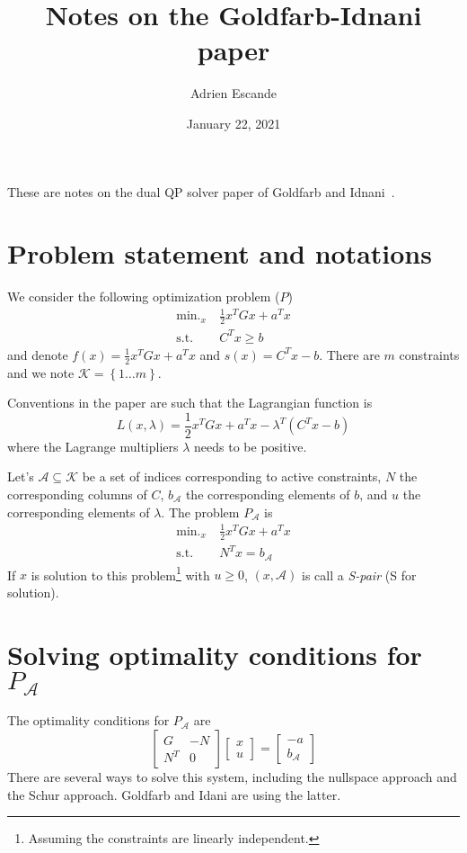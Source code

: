 \documentclass[11pt,a4paper]{article}
\newcommand{\BIN}{\begin{bmatrix}}
\newcommand{\BOUT}{\end{bmatrix}}
\DeclareMathOperator*{\minimize}{\min.}
\newcommand{\st}{\mbox{s.t.}}
\newcommand{\half}{\frac{1}{2}}
\newcommand{\act}{\mathcal{A}}
\begin{document}
\date{January 22, 2021}
\author{Adrien Escande}

\title{Notes on the Goldfarb-Idnani paper}
\maketitle

These are notes on the dual QP solver paper of Goldfarb and Idnani~\cite{Goldfarb:mp:1983}.

\section{Problem statement and notations}
We consider the following optimization problem ($P$)
\begin{align}
	\minimize_x &\ \half x^T G x + a^T x \\
	\st &\ C^T x \geq b
\end{align}
and denote $f(x) = \half x^T G x + a^T x$ and $s(x) = C^T x - b$.
There are $m$ constraints and we note $\mathcal{K} = \left\{1 \ldots m\right\}$.

Conventions in the paper are such that the Lagrangian function is
\begin{equation}
	L(x,\lambda) = \half x^T G x + a^T x - \lambda^T(C^T x - b)
\end{equation}
where the Lagrange multipliers $\lambda$ needs to be positive.

Let's $\mathcal{A} \subseteq \mathcal{K}$ be a set of indices corresponding to active constraints, $N$ the corresponding columns of $C$, $b_\mathcal{A}$ the corresponding elements of $b$, and $u$ the corresponding elements of $\lambda$. The problem $P_\mathcal{A}$ is
\begin{align}
	\minimize_x &\ \half x^T G x + a^T x \\
	\st &\ N^T x = b_\mathcal{A}
\end{align}
If $x$ is solution to this problem\footnote{Assuming the constraints are linearly independent.} with $u\geq 0$, $(x,\act)$ is call a \emph{S-pair} (S for solution).

\section{Solving optimality conditions for $P_\act$}
The optimality conditions for $P_\act$ are
\begin{equation}
	\BIN G & -N \\ N^T & 0 \BOUT \BIN x \\ u \BOUT = \BIN -a \\ b_\act \BOUT \label{eq:optimPA}
\end{equation}
There are several ways to solve this system, including the nullspace approach and the Schur approach\cite[Chap. 16]{nocedal:book:2006}. Goldfarb and Idani are using the latter.
\end{document}
